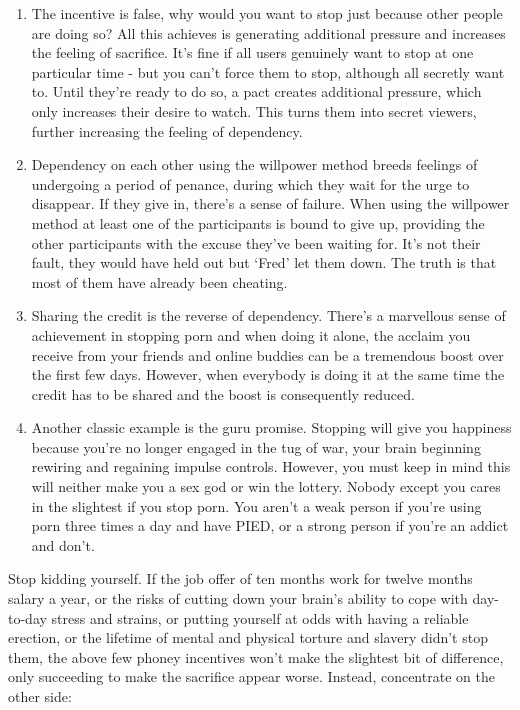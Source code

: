 \documentclass[
]{book}
\begin{document}
\begin{enumerate}
\def\labelenumi{\arabic{enumi}.}
\item
  The incentive is false, why would you want to stop just because other people are doing so? All this achieves is generating additional pressure and increases the feeling of sacrifice. It's fine if all users genuinely want to stop at one particular time - but you can't force them to stop, although all secretly want to. Until they're ready to do so, a pact creates additional pressure, which only increases their desire to watch. This turns them into secret viewers, further increasing the feeling of dependency.
\item
  Dependency on each other using the willpower method breeds feelings of undergoing a period of penance, during which they wait for the urge to disappear. If they give in, there's a sense of failure. When using the willpower method at least one of the participants is bound to give up, providing the other participants with the excuse they've been waiting for. It's not their fault, they would have held out but `Fred' let them down. The truth is that most of them have already been cheating.
\item
  Sharing the credit is the reverse of dependency. There's a marvellous sense of achievement in stopping porn and when doing it alone, the acclaim you receive from your friends and online buddies can be a tremendous boost over the first few days. However, when everybody is doing it at the same time the credit has to be shared and the boost is consequently reduced.
\item
  Another classic example is the guru promise. Stopping will give you happiness because you're no longer engaged in the tug of war, your brain beginning rewiring and regaining impulse controls. However, you must keep in mind this will neither make you a sex god or win the lottery. Nobody except you cares in the slightest if you stop porn. You aren't a weak person if you're using porn three times a day and have PIED, or a strong person if you're an addict and don't.
\end{enumerate}

Stop kidding yourself. If the job offer of ten months work for twelve months salary a year, or the risks of cutting down your brain's ability to cope with day-to-day stress and strains, or putting yourself at odds with having a reliable erection, or the lifetime of mental and physical torture and slavery didn't stop them, the above few phoney incentives won't make the slightest bit of difference, only succeeding to make the sacrifice appear worse. Instead, concentrate on the other side:
\end{document}
